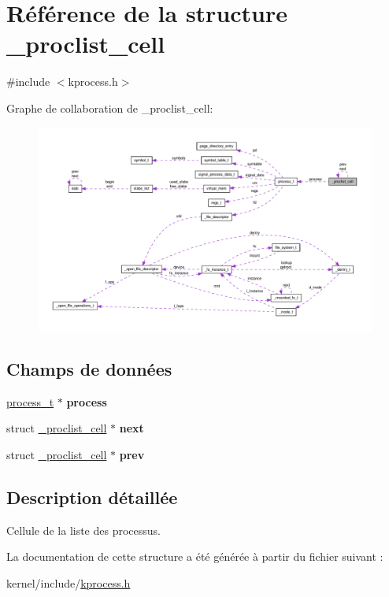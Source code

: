 \hypertarget{struct__proclist__cell}{\section{Référence de la structure \-\_\-proclist\-\_\-cell}
\label{struct__proclist__cell}
}


{\ttfamily \#include $<$kprocess.\-h$>$}



Graphe de collaboration de \-\_\-proclist\-\_\-cell\-:
\nopagebreak
\begin{figure}[H]
\begin{center}
\leavevmode
\includegraphics[width=350pt]{struct__proclist__cell__coll__graph}
\end{center}
\end{figure}
\subsection*{Champs de données}
\begin{DoxyCompactItemize}
\item 
\hypertarget{struct__proclist__cell_abe320ebc4ea6556f17dd28e93efb6b31}{\hyperlink{structprocess__t}{process\-\_\-t} $\ast$ {\bfseries process}}\label{struct__proclist__cell_abe320ebc4ea6556f17dd28e93efb6b31}

\item 
\hypertarget{struct__proclist__cell_a76062c3c8bce7b458ed610e7568c0858}{struct \hyperlink{struct__proclist__cell}{\-\_\-proclist\-\_\-cell} $\ast$ {\bfseries next}}\label{struct__proclist__cell_a76062c3c8bce7b458ed610e7568c0858}

\item 
\hypertarget{struct__proclist__cell_aee5c3bd7595d05c693fe6df63937052e}{struct \hyperlink{struct__proclist__cell}{\-\_\-proclist\-\_\-cell} $\ast$ {\bfseries prev}}\label{struct__proclist__cell_aee5c3bd7595d05c693fe6df63937052e}

\end{DoxyCompactItemize}


\subsection{Description détaillée}
Cellule de la liste des processus. 

La documentation de cette structure a été générée à partir du fichier suivant \-:\begin{DoxyCompactItemize}
\item 
kernel/include/\hyperlink{kprocess_8h}{kprocess.\-h}\end{DoxyCompactItemize}
